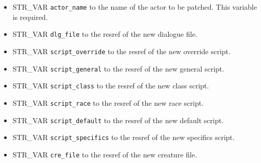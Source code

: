 \documentclass{article}
\begin{document}
\begin{itemize}
\item STR_VAR \verb+actor_name+ to the name of the actor to be patched. This variable is required.
\item STR_VAR \verb+dlg_file+ to the resref of the new dialogue file.
\item STR_VAR \verb+script_override+ to the resref of the new override script.
\item STR_VAR \verb+script_general+ to the resref of the new general script.
\item STR_VAR \verb+script_class+ to the resref of the new class script.
\item STR_VAR \verb+script_race+ to the resref of the new race script.
\item STR_VAR \verb+script_default+ to the resref of the new default script.
\item STR_VAR \verb+script_specifics+ to the resref of the new specifics script.
\item STR_VAR \verb+cre_file+ to the resref of the new creature file.
\end{itemize}
\\
\end{document}
